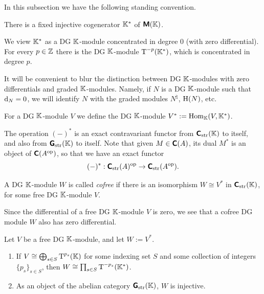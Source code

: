 In this subsection we have the following standing convention.  

\begin{conv} \label{conv:5075}
There is a fixed injective cogenerator $\mathbb{K}^*$ of $\boldsymbol{\mathsf{M}}(\mathbb{K})$.
\end{conv}

We view $\mathbb{K}^*$ as a DG $\mathbb{K}$-module concentrated in degree $0$ 
(with zero differential). 
For every $p \in \mathbb{Z}$ there is the DG $\mathbb{K}$-module $\operatorname{T}^{-p} (\mathbb{K}^*)$, 
which is concentrated in degree $p$.

It will be convenient to blur the distinction between DG $\mathbb{K}$-modules with 
zero differentials and graded $\mathbb{K}$-modules. Namely, if $N$ is a DG 
$\mathbb{K}$-module such that $\mathrm{d}_N = 0$, we will identify $N$ with the graded modules 
$N^{\natural}$, $\operatorname{H}(N)$, etc.

\begin{dfn} \label{dfn:5075}
For a DG $\mathbb{K}$-module $V$ we define the DG $\mathbb{K}$-module 
$V^* := \operatorname{Hom}_{\mathbb{K}}(V, \mathbb{K}^*)$. 
\end{dfn}

The operation $(-)^*$ is an exact contravariant functor from 
$\boldsymbol{\mathsf{C}}_{\mathrm{str}}(\mathbb{K})$ to itself, and also from 
$\boldsymbol{\mathsf{G}}_{\mathrm{str}}(\mathbb{K})$ to itself. Note that given 
$M \in \boldsymbol{\mathsf{C}}(A)$, its dual $M^*$ is an object of 
$\boldsymbol{\mathsf{C}}(A^{\mathrm{op}})$, so that we have an exact functor 
\begin{equation} \label{eqn:5075}
(-)^* : \boldsymbol{\mathsf{C}}_{\mathrm{str}}(A)^{\mathrm{op}} \to 
\boldsymbol{\mathsf{C}}_{\mathrm{str}}(A^{\mathrm{op}}) . 
\end{equation}

\begin{dfn} \label{dfn:1805}
A DG $\mathbb{K}$-module $W$ is called {\em cofree} if there is an isomorphism
$W \cong V^*$ in $\boldsymbol{\mathsf{C}}_{\mathrm{str}}(\mathbb{K})$, for some free DG $\mathbb{K}$-module 
$V$. 
\end{dfn}

Since the differential of a free DG $\mathbb{K}$-module $V$ is zero, we see that 
a cofree DG module $W$ also has zero differential. 

\begin{lem} \label{lem:5075}
Let $V$ be a free DG $\mathbb{K}$-module, and let $W := V^*$. 
\begin{enumerate}
\item If $V \cong \bigoplus\nolimits_{s \in S} \operatorname{T}^{p_s} (\mathbb{K})$
for some indexing set $S$ and some collection of integers 
$\{ p_s \}_{s \in S}$, then 
$W \cong \prod_{s \in S} \operatorname{T}^{-p_s} (\mathbb{K}^*)$. 

\item As an object of the abelian category $\boldsymbol{\mathsf{G}}_{\mathrm{str}}(\mathbb{K})$, $W$ is 
injective. 
\end{enumerate}
\end{lem}

